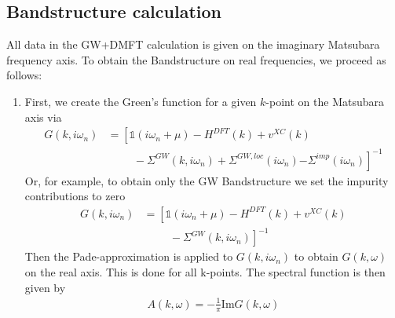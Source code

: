 \documentclass[12pt,a4paper]{scrartcl}
\numberwithin{equation}{section}
\newcommand{\unity}{\mathds{1}}
\begin{document}
\subsection{Bandstructure calculation}
All data in the GW+DMFT calculation is given on the imaginary Matsubara frequency axis. To obtain 
the Bandstructure on real frequencies, we proceed as follows:
\begin{enumerate}
\item First, we create the Green's function for a given $k$-point on the Matsubara axis via
\begin{align}
 G(k,i\omega_n) 
 &= \left[ \unity(i\omega_n+\mu ) -H^{DFT}(k) + v^{XC}(k) \right. \nonumber \\
          & \hspace{1cm}- \Sigma^{GW}(k,i\omega_n) 
          + \Sigma^{GW,loc}(i\omega_n)
          \left. - \Sigma^{imp}(i\omega_n)
           \right]^{-1} 
%
\end{align}
Or, for example, to obtain only the GW Bandstructure we set the impurity contributions to zero
\begin{align}
 G(k,i\omega_n) 
 &= \left[ \unity(i\omega_n+\mu ) -H^{DFT}(k) + v^{XC}(k) \right. \nonumber \\
          &\left. \hspace{1cm}- \Sigma^{GW}(k,i\omega_n) 
           \right]^{-1} 
%
\end{align}
Then the Pade-approximation is applied to $G(k,i\omega_n) $ to obtain $G(k,\omega) $ on the real axis.
This is done for all k-points.
The spectral function is then given by
\begin{align}
A(k,\omega) = -\frac{1}{\pi} \mathrm{Im}G(k,\omega)
\end{align}

\end{enumerate}
\end{document}
